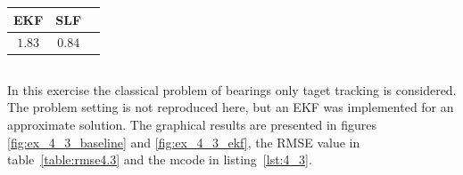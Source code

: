 \documentclass[a4paper,oneside,article]{memoir}
\newcommand{\otoprule}{\midrule[\heavyrulewidth]}
\begin{document}
\begin{table}[h]
	\centering
	\begin{tabular}{c c c}
		\otoprule
		EKF & SLF\\
		\midrule
		$1.83$ & $0.84$\\
		\bottomrule
	\end{tabular}
	\label{table:rmse4.1}
\end{table}






\subsection{}

\subsection{}\label{sec:4_3}
\subsubsection{}\label{sec:4_3a}
In this exercise the classical problem of bearings only taget tracking is considered.
The problem setting is not reproduced here, but an EKF was implemented for an approximate
solution. The graphical results are presented in figures \ref{fig:ex_4_3_baseline} and \ref{fig:ex_4_3_ekf}, the RMSE value
in table~\ref{table:rmse4.3} and the mcode in listing~\ref{lst:4_3}.

\end{document}

